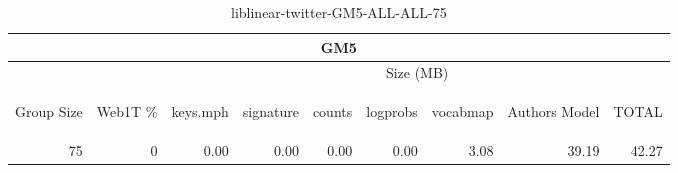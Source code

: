 \begin{center}
\begin{table}[htbp] 
 \begin{center}
\begin{tabular}{ | r | r | r | r | r | r | r | r | r |}
\hline
\multicolumn{9}{|c|}{GM5}\\
\hline
 & & \multicolumn{7}{|c|}{Size (MB)}\\ \cline{3-9}
\begin{sideways}Group Size\end{sideways} & \begin{sideways}Web1T \% \end{sideways} & \begin{sideways}keys.mph\end{sideways} & \begin{sideways}signature\end{sideways} & \begin{sideways}counts\end{sideways} & \begin{sideways}logprobs\end{sideways} & \begin{sideways}vocabmap\end{sideways} & \begin{sideways}Authors Model \end{sideways} & \begin{sideways}TOTAL\end{sideways}\\
\hline
\multirow{0}{*}{75}
 & 0 & 0.00 & 0.00 & 0.00 & 0.00 & 3.08 & 39.19 & 42.27\\ \cline{2-9}
\hline
\end{tabular}
\caption{liblinear-twitter-GM5-ALL-ALL-75}
\label{table:liblinear-twitter-GM5-ALL-ALL-75}
\end{center}
 \end{table}
\end{center}

